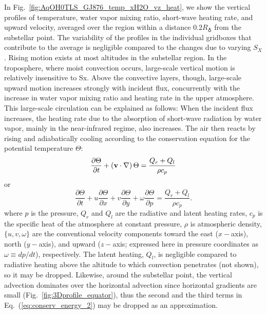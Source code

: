 \documentclass[11pt,numberedappendix,twocolappendix,]{emulateapj}
\def\wv{water vapor}
\newcommand{\yf}[1]{{\color{orange}#1}}
\begin{document}
In Fig.~\ref{fig:AqOH0TLS_GJ876_temp_xH2O_vz_heat}, we show the vertical profiles of temperature, \wv{} mixing ratio, short-wave heating rate, and upward velocity, averaged over the region within a distance $0.2R_\earth$ from the substellar point. 
The \yf{variability of the profiles in the individual gridboxes that contribute to the average}
is negligible compared to the changes due to varying $S_X$. 
%
\yf{Rising motion exists at most altitudes in the substellar region.  In the troposphere, where moist convection occurs, large-scale vertical motion is relatively insensitive to Sx.  Above the convective layers, though, large-scale upward motion increases strongly with incident flux,}
%
concurrently with the increase in \wv{} mixing ratio and heating rate in the upper atmosphere. 
This large-scale circulation can be explained as follows: When the incident flux increases, the heating rate due to the absorption of short-wave radiation by \wv{}, mainly \yf{in the near-infrared regime}, also increases. 
The air then reacts by rising and adiabatically cooling according to the conservation equation for the potential temperature $\Theta $:
\begin{equation}
\frac{\partial \Theta }{\partial t} + ( {\bf v} \cdot \nabla ) \, \Theta = \frac{ Q_r + Q_l }{\rho c_p} \label{eq:conserv_energy}
\end{equation}
or
\begin{equation}
\frac{\partial \Theta }{\partial t} + u \frac{\partial \Theta }{\partial x} + v\frac{\partial \Theta }{\partial y} + \omega \frac{\partial \Theta }{\partial p} = \frac{ Q_r + Q_l }{\rho c_p}. \label{eq:conserv_energy_2}
\end{equation}
where $p$ is the pressure, $Q_r$ and $Q_l$ are the radiative and latent heating rates, $c_p$ is the specific heat of the atmosphere at constant pressure, $\rho $ is atmospheric density, $\{ u, v, \omega \}$ are the conventional velocity components toward the east ($x-$axis), north ($y-$axis), and upward ($z-$axis; expressed here in pressure coordinates as $\omega \equiv dp/dt$), respectively. 
The latent heating, $Q_l$, is negligible compared to radiative heating above the altitude to which convection penetrates (not shown), so it may be dropped. 
Likewise, around the substellar point, the vertical advection dominates over the horizontal advection since horizontal gradients are small (Fig.~\ref{fig:3Dprofile_equator}), thus the second and the third terms in Eq.~(\ref{eq:conserv_energy_2}) may be dropped as an approximation. 
\end{document}
